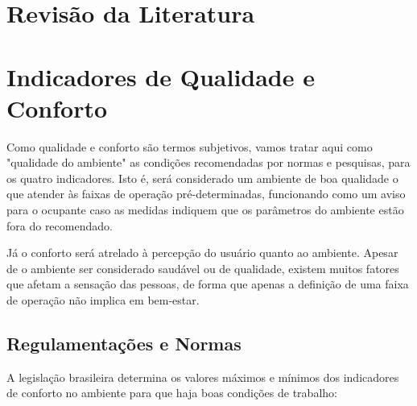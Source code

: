 \documentclass[../monografia.tex]{subfiles}
\begin{document}
\section{Revisão da Literatura} 

\section{Indicadores de Qualidade e Conforto} 


Como qualidade e conforto são termos subjetivos, vamos tratar aqui como "qualidade do ambiente" as condições recomendadas por normas e pesquisas, para os quatro indicadores. Isto é, será considerado um ambiente de boa qualidade o que atender às faixas de operação pré-determinadas, funcionando como um aviso para o ocupante caso as medidas indiquem que os parâmetros do ambiente estão fora do recomendado. 

Já o conforto será atrelado à percepção do usuário quanto ao ambiente. Apesar de o ambiente ser considerado saudável ou de qualidade, existem muitos fatores que afetam a sensação das pessoas, de forma que apenas a definição de uma faixa de operação não implica em bem-estar. 

\subsection{Regulamentações e Normas} %

A legislação brasileira determina os valores máximos e mínimos dos indicadores de conforto no ambiente para que haja boas condições de trabalho: 
\end{document}
